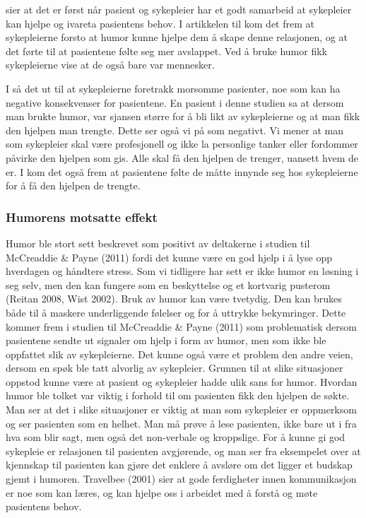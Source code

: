  sier at det er først når pasient og sykepleier har et
godt samarbeid at sykepleier kan hjelpe og ivareta pasientens behov. I
artikkelen til  kom det frem at sykepleierne forsto at humor
kunne hjelpe dem å skape denne relasjonen, og at det førte til at pasientene
følte seg mer avslappet. Ved å bruke humor fikk sykepleierne vise at de også
bare var mennesker.

I  så det ut til at sykepleierne foretrakk morsomme pasienter,
noe som kan ha negative konsekvenser for pasientene. En pasient i denne studien
sa at dersom man brukte humor, var sjansen større for å bli likt av
sykepleierne og at man fikk den hjelpen man trengte. Dette ser også vi på som
negativt. Vi mener at man som sykepleier skal være profesjonell og ikke la
personlige tanker eller fordommer påvirke den hjelpen som gis. Alle skal få den
hjelpen de trenger, uansett hvem de er. I  kom det også
frem at pasientene følte de måtte innynde seg hos sykepleierne for å få den
hjelpen de trengte.

\subsubsection{Humorens motsatte effekt}

Humor ble stort sett beskrevet som positivt av deltakerne i studien til
McCreaddie \&{} Payne (2011) fordi det kunne være en god hjelp i å lyse opp
hverdagen og håndtere stress. Som vi tidligere har sett er ikke humor en
løsning i seg selv, men den kan fungere som en beskyttelse og et kortvarig
pusterom (Reitan 2008, Wist 2002). Bruk av humor kan være tvetydig. Den kan
brukes både til å maskere underliggende følelser og for å uttrykke bekymringer.
Dette kommer frem i studien til McCreaddie \&{} Payne (2011) som problematisk
dersom pasientene sendte ut signaler om hjelp i form av humor, men som ikke ble
oppfattet slik av sykepleierne. Det kunne også være et problem den andre veien,
dersom en spøk ble tatt alvorlig av sykepleier. Grunnen til at slike
situasjoner oppstod kunne være at pasient og sykepleier hadde ulik sans for
humor. Hvordan humor ble tolket var viktig i forhold til om pasienten fikk den
hjelpen de søkte. Man ser at det i slike situasjoner er viktig at man som
sykepleier er oppmerksom og ser pasienten som en helhet. Man må prøve å lese
pasienten, ikke bare ut i fra hva som blir sagt, men også det non-verbale og
kroppslige. For å kunne gi god sykepleie er relasjonen til pasienten
avgjørende, og man ser fra eksempelet over at kjennskap til pasienten kan gjøre
det enklere å avsløre om det ligger et budskap gjemt i humoren. Travelbee
(2001) sier at gode ferdigheter innen kommunikasjon er noe som kan læres, og
kan hjelpe oss i arbeidet med å forstå og møte pasientens behov.


